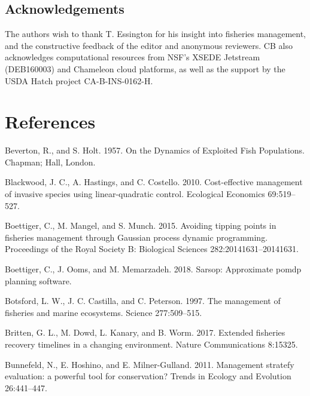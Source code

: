 \documentclass[3p]{elsarticle} %
\begin{document}
\hypertarget{acknowledgements}{%
\subsection{Acknowledgements}\label{acknowledgements}}

The authors wish to thank T. Essington for his insight into fisheries
management, and the constructive feedback of the editor and anonymous
reviewers. CB also acknowledges computational resources from NSF's XSEDE
Jetstream (DEB160003) and Chameleon cloud platforms, as well as the
support by the USDA Hatch project CA-B-INS-0162-H.

\hypertarget{references}{%
\section*{References}\label{references}}

\hypertarget{refs}{}
\leavevmode\hypertarget{ref-Beverton1957}{}%
Beverton, R., and S. Holt. 1957. On the Dynamics of Exploited Fish
Populations. Chapman; Hall, London.

\leavevmode\hypertarget{ref-Blackwood2010}{}%
Blackwood, J. C., A. Hastings, and C. Costello. 2010. Cost-effective
management of invasive species using linear-quadratic control.
Ecological Economics 69:519--527.

\leavevmode\hypertarget{ref-Boettiger2015}{}%
Boettiger, C., M. Mangel, and S. Munch. 2015. Avoiding tipping points in
fisheries management through Gaussian process dynamic programming.
Proceedings of the Royal Society B: Biological Sciences
282:20141631--20141631.

\leavevmode\hypertarget{ref-sarsop-pkg}{}%
Boettiger, C., J. Ooms, and M. Memarzadeh. 2018. Sarsop: Approximate
pomdp planning software.

\leavevmode\hypertarget{ref-Botsford1997}{}%
Botsford, L. W., J. C. Castilla, and C. Peterson. 1997. The management
of fisheries and marine ecosystems. Science 277:509--515.

\leavevmode\hypertarget{ref-Britten2017}{}%
Britten, G. L., M. Dowd, L. Kanary, and B. Worm. 2017. Extended
fisheries recovery timelines in a changing environment. Nature
Communications 8:15325.

\leavevmode\hypertarget{ref-Bunnefeld2011}{}%
Bunnefeld, N., E. Hoshino, and E. Milner-Gulland. 2011. Management
stratefy evaluation: a powerful tool for conservation? Trends in Ecology
and Evolution 26:441--447.
\end{document}

